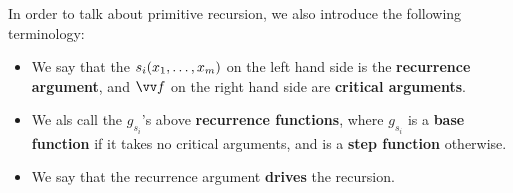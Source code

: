 In order to talk about primitive recursion, we also introduce the following
terminology:

\begin{itemize}

\item We say that the $s_i{\mathopen{}\left({x_1,\ldots,x_m}\right)\mathclose{}}$ on the left hand side is the
\textbf{recurrence argument}, and $\vect{f}$ on the right hand side are
\textbf{critical arguments}.


\item We als call the $g_{s_i}$'s above \textbf{recurrence functions}, where
$g_{s_i}$ is a \textbf{base function} if it takes no critical arguments, and is
a \textbf{step function} otherwise.


\item We say that the recurrence argument \textbf{drives} the recursion.


\end{itemize}

